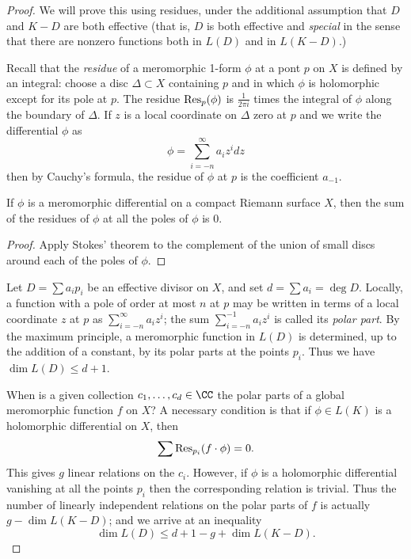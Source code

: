 \begin{proof}
 We will prove this using residues, under the additional assumption that  $D$ and $K-D$ are both effective (that is, $D$ is both effective and \emph{special} in the sense that there are nonzero functions
both in $L(D)$ and in $L(K-D)$.)

Recall that the \emph{residue} of a meromorphic 1-form $\phi$ at a pont $p$ on $X$ is defined by an integral: choose a disc $\Delta \subset X$ containing $p$ and in which $\phi$ is holomorphic except for its pole at $p$. The residue ${\rm Res}_p(\phi)$ is $\frac{1}{2\pi i}$ times the integral of $\phi$ along the boundary of $\Delta$. If $z$ is a local coordinate on $\Delta$ zero at $p$ and we write the differential $\phi$ as
$$
\phi = \sum_{i=-n}^\infty a_iz^i dz
$$
then by Cauchy's formula, the residue of $\phi$ at $p$ is the coefficient $a_{-1}$. 

\begin{proposition}\label{residue sum}
 If $\phi$ is a meromorphic differential on a compact Riemann surface $X$, then the sum of the residues of $\phi$
 at all the poles of $\phi$ is 0.
 \end{proposition}
 
\begin{proof}
Apply Stokes' theorem to the complement of the union of small discs around each of the poles of $\phi$.
\end{proof}

Let  $D = \sum a_ip_i$ be an effective divisor on $X$, and set $d = \sum a_i = \deg D$. Locally, a function with a pole of order at most $n$ at $p$ may be written in terms of a local coordinate $z$ at $p$ as $\sum_{i=-n}^\infty a_{i}z^{i} $;
the sum $\sum_{i=-n}^{-1} a_{i}z^{i}$ is called its \emph{polar part}.
By the maximum principle, a meromorphic function in $L(D)$ is determined, up to the addition of a constant, by its polar parts at the points $p_i$. Thus we have $\dim L(D) \leq d+1$.

When is a given collection $c_1,\dots,c_d \in \CC$ the polar parts of a global meromorphic function $f$ on $X$? A necessary condition
is that if $\phi \in L(K)$ is a holomorphic differential on $X$, then
$$
\sum {\rm Res}_{p_i}(f \cdot \phi) = 0.
$$
This gives $g$ linear relations on the $c_i$. However, if $\phi$ is a holomorphic differential vanishing at all the points $p_i$
then the corresponding relation is trivial. Thus the number of linearly independent relations on the polar parts of $f$ is actually $g - \dim L(K-D)$; and we arrive at an inequality
$$
\dim L(D) \leq d + 1 - g + \dim L(K-D).
$$


\end{proof}
